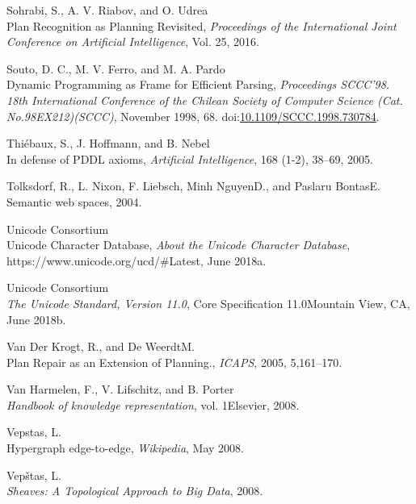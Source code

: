\documentclass[11pt,a4paper,twoside,openright,titlepage,numbers=noenddot,headinclude,cleardoublepage=empty,openany]{scrreprt}
\theoremstyle{plain}
\theoremstyle{definition}
\theoremstyle{remark}
\begin{document}
\leavevmode\hypertarget{ref-sohrabi_plan_2016}{}%
Sohrabi, S., A. V. Riabov, and O. Udrea\\
Plan Recognition as Planning Revisited, \emph{Proceedings of the
International Joint Conference on Artificial Intelligence}, Vol. 25,
2016.

\leavevmode\hypertarget{ref-souto_dynamic_1998}{}%
Souto, D. C., M. V. Ferro, and M. A. Pardo\\
Dynamic Programming as Frame for Efficient Parsing, \emph{Proceedings
SCCC'98. 18th International Conference of the Chilean Society of
Computer Science (Cat. No.98EX212)(SCCC)}, November 1998, 68.
doi:\href{https://doi.org/10.1109/SCCC.1998.730784}{10.1109/SCCC.1998.730784}.

\leavevmode\hypertarget{ref-thiebaux_defense_2005}{}%
Thiébaux, S., J. Hoffmann, and B. Nebel\\
In defense of PDDL axioms, \emph{Artificial Intelligence}, 168 (1-2),
38--69, 2005.

\leavevmode\hypertarget{ref-tolksdorf_semantic_2004}{}%
Tolksdorf, R., L. Nixon, F. Liebsch, Minh NguyenD., and Paslaru
BontasE.\\
Semantic web spaces, 2004.

\leavevmode\hypertarget{ref-unicodeconsortium_unicode_2018}{}%
Unicode Consortium\\
Unicode Character Database, \emph{About the Unicode Character Database},
https://www.unicode.org/ucd/\#Latest, June 2018a.

\leavevmode\hypertarget{ref-unicodeconsortium_unicode_2018a}{}%
Unicode Consortium\\
\emph{The Unicode Standard, Version 11.0}, Core Specification
11.0Mountain View, CA, June 2018b.

\leavevmode\hypertarget{ref-vanderkrogt_plan_2005}{}%
Van Der Krogt, R., and De WeerdtM.\\
Plan Repair as an Extension of Planning., \emph{ICAPS}, 2005,
5,161--170.

\leavevmode\hypertarget{ref-vanharmelen_handbook_2008}{}%
Van Harmelen, F., V. Lifschitz, and B. Porter\\
\emph{Handbook of knowledge representation}, vol. 1Elsevier, 2008.

\leavevmode\hypertarget{ref-vepstas_hypergraph_2008}{}%
Vepstas, L.\\
Hypergraph edge-to-edge, \emph{Wikipedia}, May 2008.

\leavevmode\hypertarget{ref-vepstas_sheaves_2008}{}%
Vepštas, L.\\
\emph{Sheaves: A Topological Approach to Big Data}, 2008.
\end{document}

